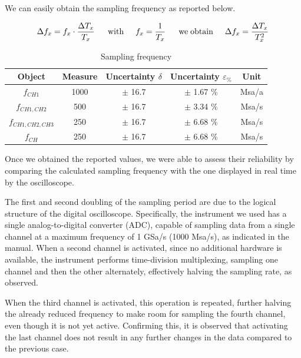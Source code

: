 \documentclass[../main.tex]{subfiles}
\begin{document}
We can easily obtain the sampling frequency as reported below.

\begin{equation}
	\Delta f_x = f_x \cdot \frac{\Delta T_x}{T_x} \hspace{0.5cm} \, \mathrm{with} \hspace{0.5cm} f_x = \frac{1}{T_x} \hspace{0.5cm} \, \mathrm{we\;obtain} \hspace{0.5cm} \Delta f_x = \frac{\Delta T_x}{T^2_x}
\end{equation}

\begin{table}[h!]
\centering	

\begin{tabular}{ccccc}
\textbf{Object} & \textbf{Measure} & \textbf{Uncertainty $\delta$} & \textbf{Uncertainty $\varepsilon_{\%}$} & \textbf{Unit}  \\
\hline

$f_{\unit{CH1}}$ & 1000 & $\pm$ 16.7 & $\pm$ 1.67 \% & Msa/a \\
\hline
$f_{\unit{CH1,CH2}}$ & 500 & $\pm$ 16.7 & $\pm$  3.34 \% & Msa/s \\
\hline
$f_{\unit{CH1,CH2,CH3}}$ & 250 & $\pm$ 16.7 & $\pm$ 6.68 \% & Msa/s   \\
\hline
$f_{\unit{CH}}$ & 250  & $\pm$ 16.7 &  $\pm$  6.68 \%  & Msa/s   \\

\end{tabular}
\caption*{Sampling frequency}
\end{table}


Once we obtained the reported values, we were able to assess their reliability by comparing the calculated sampling frequency with the one displayed in real time by the oscilloscope.

The first and second doubling of the sampling period are due to the logical structure of the digital oscilloscope. Specifically, the instrument we used has a single analog-to-digital converter (ADC), capable of sampling data from a single channel at a maximum frequency of 1 GSa/s (1000 Msa/s), as indicated in the manual. When a second channel is activated, since no additional hardware is available, the instrument performs time-division multiplexing, sampling one channel and then the other alternately, effectively halving the sampling rate, as observed.

When the third channel is activated, this operation is repeated, further halving the already reduced frequency to make room for sampling the fourth channel, even though it is not yet active. Confirming this, it is observed that activating the last channel does not result in any further changes in the data compared to the previous case.
\end{document}
